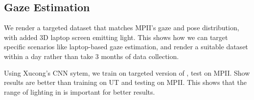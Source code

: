 
\subsection{Gaze Estimation}



We render a targeted dataset that matches MPII's gaze and pose distribution, with added 3D laptop screen emitting light. This shows how we can target specific scenarios like laptop-based gaze estimation, and render a suitable dataset within a day rather than take 3 months of data collection.

Using Xucong's CNN sytem, we train on targeted version of \dataset, test on MPII. Show results are better than training on UT and testing on MPII. This shows that the range of lighting in \dataset is important for better results.


